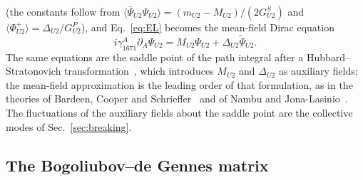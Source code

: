 (the constants follow from $\langle\bar\Psi_{U2}\Psi_{U2}\rangle=(m_{U2}-M_{U2})/(2G^S_{U2})$ and
$\langle\Phi^+_{U2}\rangle=\Delta_{U2}/G^P_{U2}$), and Eq.~\eqref{eq:EL} becomes the mean-field
Dirac equation
\begin{equation}
i\gamma^A_{1671}\partial_A\Psi_{U2}=M_{U2}\Psi_{U2}+\Delta_{U2}\tilde\Psi_{U2}.
\label{eq:MFDirac}
\end{equation}
The same equations are the saddle point of the path integral after a Hubbard--Stratonovich
transformation~\cite{Hubbard1959,Stratonovich1957}, which introduces $M_{U2}$ and $\Delta_{U2}$ as
auxiliary fields; the mean-field approximation is the leading order of that formulation, as in
the theories of Bardeen, Cooper and Schrieffer~\cite{BCS1957} and of Nambu and
Jona-Lasinio~\cite{NJL1961}. The fluctuations of the auxiliary fields about the saddle point are
the collective modes of Sec.~\ref{sec:breaking}.

\subsection{The Bogoliubov--de Gennes matrix}

